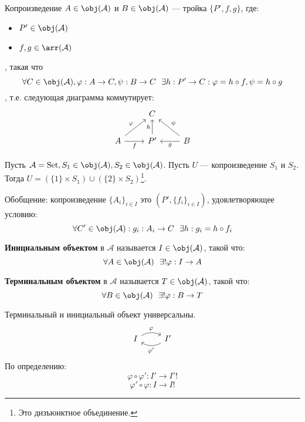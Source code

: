 \begin{definition}
    Копроизведение \(A \in \obj(\mathcal{A})\) и \(B \in \obj(\mathcal{A})\) --- тройка \(\{P', f, g\}\), где:
    \begin{itemize}
        \item \(P' \in \obj(\mathcal{A})\)
        \item \(f, g \in \arr(\mathcal{A})\)
    \end{itemize}
    , такая что
    \[\forall C \in \obj(\mathcal{A}), \varphi : A \to C, \psi : B \to C \ \ \exists h : P' \to C : \varphi = h \circ f, \psi = h \circ g\]
    , т.е. следующая диаграмма коммутирует:
    \[\begin{tikzcd}
            & C & \\
            A \arrow{ur}{\varphi} \arrow[swap]{r}{f} & P' \arrow{u}{h} & B \arrow{l}{g} \arrow[swap]{ul}{\psi}
        \end{tikzcd}\]
\end{definition}

\begin{example}
    Пусть \(\mathcal{A} = \mathrm{Set}, S_1 \in \obj(\mathcal{A}), S_2 \in \obj(\mathcal{A})\). Пусть \(U\) --- копроизведение \(S_1\) и \(S_2\). Тогда \(U = (\{1\} \times S_1) \cup (\{2\} \times S_2)\)\footnote{Это дизъюнктное объединение.}.
\end{example}

Обобщение: копроизведение \(\{A_i\}_{i \in I}\) это \((P', \{f_i\}_{i \in I})\), удовлетворяющее условию:
\[\forall C' \in \obj(\mathcal{A}) : g_i : A_i \to C \ \ \exists h : g_i = h \circ f_i\]

\begin{definition}
    \textbf{Инициальным объектом} в \(\mathcal{A}\) называется \(I \in \obj(\mathcal{A})\), такой что:
    \[\forall A \in \obj(\mathcal{A}) \ \ \exists! \varphi : I \to A\]
\end{definition}

\begin{definition}
    \textbf{Терминальным объектом} в \(\mathcal{A}\) называется \(T \in \obj(\mathcal{A})\), такой что:
    \[\forall B \in \obj(\mathcal{A}) \ \ \exists! \varphi : B \to T\]
\end{definition}

\begin{remark}
    Терминальный и инициальный объект универсальны.
    \[\begin{tikzcd}
            I \arrow[bend left]{r}{\varphi} & I' \arrow[bend left]{l}{\varphi'}
        \end{tikzcd}\]
    По определению:
    \[\varphi \circ \varphi' : I' \to I'!\]
    \[\varphi' \circ \varphi : I \to I!\]
\end{remark}

